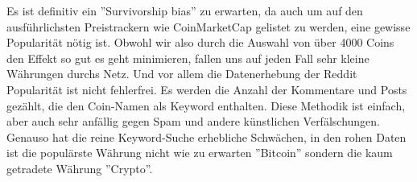 \documentclass[12pt]{article}
\begin{document}
Es ist definitiv ein ''Survivorship bias'' zu erwarten, da auch um auf den ausführlichsten Preistrackern wie CoinMarketCap gelistet zu werden, eine gewisse Popularität nötig ist. Obwohl wir also durch die Auswahl von über 4000 Coins den Effekt so gut es geht minimieren, fallen uns auf jeden Fall sehr kleine Währungen durchs Netz. Und vor allem die Datenerhebung der Reddit Popularität ist nicht fehlerfrei. Es werden die Anzahl der Kommentare und Posts gezählt, die den Coin-Namen als Keyword enthalten. Diese Methodik ist einfach, aber auch sehr anfällig gegen Spam und andere künstlichen Verfälschungen. Genauso hat die reine Keyword-Suche erhebliche Schwächen, in den rohen Daten ist die populärste Währung nicht wie zu erwarten ''Bitcoin'' sondern die kaum getradete Währung ''Crypto''.
\end{document}
